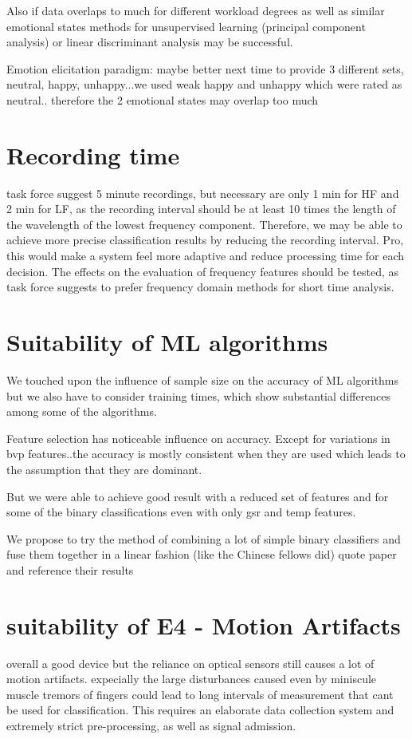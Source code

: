 Also if data overlaps to much for different workload degrees as well as similar emotional states methods for unsupervised learning (principal component analysis) or linear discriminant analysis may be successful.

Emotion elicitation paradigm: maybe better next time to provide 3 different sets, neutral, happy, unhappy...we used weak happy and unhappy which were rated as neutral.. therefore the 2 emotional states may overlap too much
\section{Recording time}
task force suggest 5 minute recordings, but necessary are only 1 min for HF and 2 min for LF, as the recording interval should be at least 10 times the length of the wavelength of the lowest frequency component.
Therefore, we may be able to achieve more precise classification results by reducing the recording interval. Pro, this would make a system feel more adaptive and reduce processing time for each decision. The effects on the evaluation of frequency features should be tested, as task force suggests to prefer frequency domain methods for short time analysis.
\section{Suitability of ML algorithms}
We touched upon the influence of sample size on the accuracy of ML algorithms but we also have to consider training times, which show substantial differences among some of the algorithms.

Feature selection has noticeable influence on accuracy. Except for variations in bvp features..the accuracy is mostly consistent when they are used which leads to the assumption that they are dominant.

But we were able to achieve good result with a reduced set of features and for some of the binary classifications even with only gsr and temp features.

We propose to try the method of combining a lot of simple binary classifiers and fuse them together in a linear fashion (like the Chinese fellows did) quote paper and reference their results

\section{suitability of E4 - Motion Artifacts}
overall a good device but the reliance on optical sensors still causes a lot of motion artifacts. expecially the large disturbances caused even by miniscule muscle tremors of fingers could lead to long intervals of measurement that cant be used for classification. This requires an elaborate data collection system and extremely strict pre-processing, as well as signal admission.

